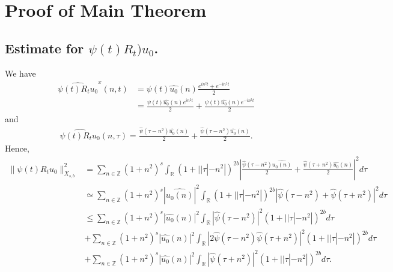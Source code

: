 \documentclass[12pt,reqno]{amsart}
\numberwithin{equation}{section}  %
\numberwithin{figure}{section}
\newcommand{\rr}{\mathbb{R}}
\newcommand{\zz}{\mathbb{Z}}
\newcommand{\wh}{\widehat}
\begin{document}
\section{Proof of Main Theorem} 
\label{sec:pf-main-thm}
%
%

\subsection{Estimate for $\psi(t) R_{t})u_{0}$.} 
We have
%
%
\begin{equation*}
  \begin{split}
    \wh{\psi(t)R_{t}u_{0}}^{x}(n, t)
    & = \psi(t) \wh{u_{0}}(n) \frac{e^{in^2 t} + e^{-in^{2}t}}{2}
    \\
    & = \frac{\psi(t) \wh{u_{0}}(n)e^{in^{2}t}}{2} + \frac{\psi(t)
    \wh{u_{0}}(n)e^{-in^{2}t}}{2}  
  \end{split}
\end{equation*}
%
%
and
%
%
\begin{equation*}
  \begin{split}
    \wh{\psi(t) R_{t}u_{0}}(n, \tau) = \frac{\wh{\psi}(\tau -
    n^{2})\wh{u_{0}}(n)}{2} + \frac{\wh{\psi}(\tau - n^{2})\wh{u_{0}}(n)}{2}.
  \end{split}
\end{equation*}
%
%
Hence,
%
%
\begin{equation}
  \begin{split}
    \| \psi(t) R_{t}u_{0} \|_{X_{s,b}}^{2} 
    & = \sum_{n \in \zz}(1 + n^{2})^{s} \int_{\rr}\left( 1 + | | \tau
    |-n^{2} | \right)^{2b} | \frac{\wh{\psi}(\tau - n^{2})\wh{u_{0}(n)}}{2} +
    \frac{\wh{\psi}(\tau + n^{2})\wh{u_{0}}(n)}{2} |^{2} d \tau
    \\
    & \simeq \sum_{n \in \zz}(1 + n^{2})^{s} | \wh{u_{0}(n)} |^{2} \int_{\rr}
    \left( 1 + | | \tau | - n^{2} | \right)^{2b} | \wh{\psi}(\tau - n^{2}) +
    \wh{\psi}(\tau + n^{2}) |^{2} d \tau
    \\
    & \le \sum_{n \in \zz} \left( 1 + n^{2} \right)^{s} | \wh{u_{0}}(n)
    |^{2} \int_{\rr} | \wh{\psi}(\tau - n^{2}) |^{2}\left( 1 + | | \tau | -
    n^{2} | \right)^{2b} d \tau
    \\
    & + \sum_{n \in \zz} \left( 1 + n^{2} \right)^{s} | \wh{u_{0}}(n)
    |^{2} \int_{\rr} | 2\wh{\psi}(\tau - n^{2})\wh{\psi}(\tau + n^{2}) |^{2}\left( 1 + | | \tau | -
    n^{2} | \right)^{2b} d \tau
    \\
    & + \sum_{n \in \zz} \left( 1 + n^{2} \right)^{s} | \wh{u_{0}}(n)
    |^{2} \int_{\rr} | \wh{\psi}(\tau + n^{2}) |^{2}\left( 1 + | | \tau | -
    n^{2} | \right)^{2b} d \tau.
  \end{split}
  \label{u-0-norm-comp}
\end{equation}
\end{document}
